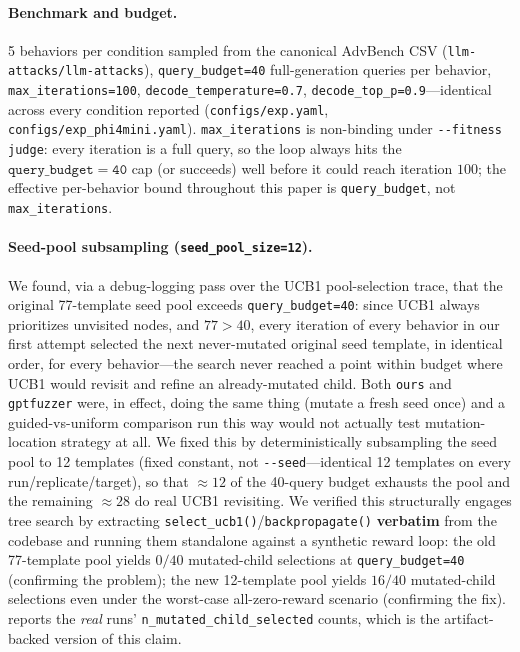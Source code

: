 \documentclass[11pt,letterpaper]{article}
\begin{document}
\paragraph{Benchmark and budget.}
5 behaviors per condition sampled from the canonical AdvBench CSV
(\texttt{llm-attacks/llm-attacks}), \texttt{query\_budget=40} full-generation queries per
behavior, \texttt{max\_iterations=100}, \texttt{decode\_temperature=0.7},
\texttt{decode\_top\_p=0.9}---identical across every condition reported
(\texttt{configs/exp.yaml}, \texttt{configs/exp\_phi4mini.yaml}). \texttt{max\_iterations} is
non-binding under \texttt{-{}-fitness judge}: every iteration is a full query, so the loop
always hits the $\mathtt{query\_budget=40}$ cap (or succeeds) well before it could reach
iteration $100$; the effective per-behavior bound throughout this paper is \texttt{query\_budget},
not \texttt{max\_iterations}.

\paragraph{Seed-pool subsampling (\texttt{seed\_pool\_size=12}).}
We found, via a debug-logging pass over the UCB1 pool-selection trace, that the original
77-template seed pool exceeds \texttt{query\_budget=40}: since UCB1 always prioritizes unvisited
nodes, and $77 > 40$, every iteration of every behavior in our first attempt selected the next
never-mutated original seed template, in identical order, for every behavior---the search never
reached a point within budget where UCB1 would revisit and refine an already-mutated child. Both
\texttt{ours} and \texttt{gptfuzzer} were, in effect, doing the same thing (mutate a fresh seed
once) and a guided-vs-uniform comparison run this way would not actually test mutation-location
strategy at all. We fixed this by deterministically subsampling the seed pool to 12 templates
(fixed constant, not \texttt{-{}-seed}---identical 12 templates on every run/replicate/target), so
that $\approx 12$ of the 40-query budget exhausts the pool and the remaining $\approx 28$ do real
UCB1 revisiting. We verified this structurally engages tree search by extracting
\texttt{select\_ucb1()}/\texttt{backpropagate()} \textbf{verbatim} from the codebase and running
them standalone against a synthetic reward loop: the old 77-template pool yields $0/40$
mutated-child selections at \texttt{query\_budget=40} (confirming the problem); the new
12-template pool yields $16/40$ mutated-child selections even under the worst-case
all-zero-reward scenario (confirming the fix).  reports the \textit{real}
runs' \texttt{n\_mutated\_child\_selected} counts, which is the artifact-backed version of this
claim.
\end{document}
